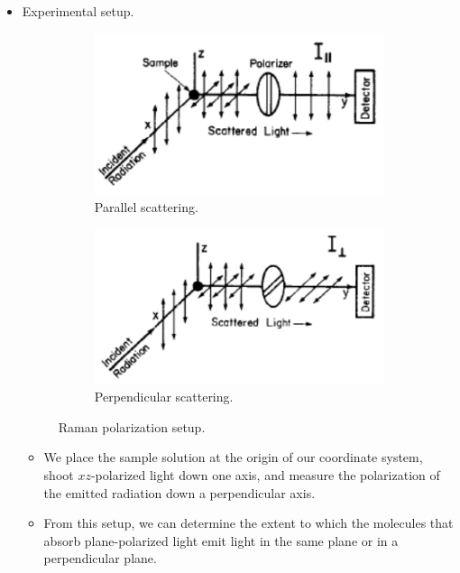 \documentclass[../notes.tex]{subfiles}
\begin{document}
\begin{itemize}
    \item Experimental setup.
    \begin{figure}[h!]
        \centering
        \begin{subfigure}[b]{0.49\linewidth}
            \centering
            \includegraphics[width=0.8\linewidth]{../ExtFiles/ramanPola.png}
            \caption{Parallel scattering.}
            \label{fig:ramanPola}
        \end{subfigure}
        \begin{subfigure}[b]{0.49\linewidth}
            \centering
            \includegraphics[width=0.8\linewidth]{../ExtFiles/ramanPolb.png}
            \caption{Perpendicular scattering.}
            \label{fig:ramanPolb}
        \end{subfigure}
        \caption{Raman polarization setup.}
        \label{fig:ramanPol}
    \end{figure}
    \begin{itemize}
        \item We place the sample solution at the origin of our coordinate system, shoot $xz$-polarized light down one axis, and measure the polarization of the emitted radiation down a perpendicular axis.
        \item From this setup, we can determine the extent to which the molecules that absorb plane-polarized light emit light in the same plane or in a perpendicular plane.

\end{itemize}
\end{itemize}
\end{document}

